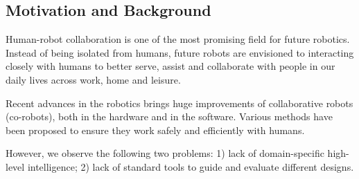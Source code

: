 \setcounter{page}{1}
\renewcommand{\thepage}{\arabic{page}}

%
%

\subsection{Motivation and Background\label{sec: motivation}}

Human-robot collaboration is one of the most promising field for future robotics. Instead of being isolated from humans, future robots are envisioned to interacting closely with humans to better serve, assist and collaborate with people in our daily lives across work, home and leisure.

Recent advances in the robotics brings huge improvements of collaborative robots (co-robots), both in the hardware and in the software. Various methods have been proposed to ensure they work safely and efficiently with humans. 

However, we observe the following two problems: 1) lack of domain-specific high-level intelligence; 2) lack of standard tools to guide and evaluate different designs.

